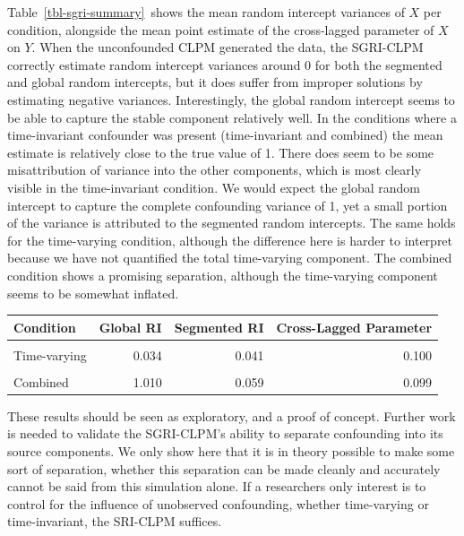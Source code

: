 \documentclass[
  man,
  floatsintext,
  longtable,
  nolmodern,
  notxfonts,
  notimes,
  colorlinks=true,linkcolor=blue,citecolor=blue,urlcolor=blue]{apa7}
\begin{document}
Table~\ref{tbl-sgri-summary}~shows the mean random intercept variances
of \(X\) per condition, alongside the mean point estimate of the
cross-lagged parameter of \(X\) on \(Y\). When the unconfounded CLPM
generated the data, the SGRI-CLPM correctly estimate random intercept
variances around 0 for both the segmented and global random intercepts,
but it does suffer from improper solutions by estimating negative
variances. Interestingly, the global random intercept seems to be able
to capture the stable component relatively well. In the conditions where
a time-invariant confounder was present (time-invariant and combined)
the mean estimate is relatively close to the true value of 1. There does
seem to be some misattribution of variance into the other components,
which is most clearly visible in the time-invariant condition. We would
expect the global random intercept to capture the complete confounding
variance of 1, yet a small portion of the variance is attributed to the
segmented random intercepts. The same holds for the time-varying
condition, although the difference here is harder to interpret because
we have not quantified the total time-varying component. The combined
condition shows a promising separation, although the time-varying
component seems to be somewhat inflated.

\begin{table}

{\caption{{Mean of Point Estimates for SGRI Model Parameters Across
Simulation Conditions}{\label{tbl-sgri-summary}}}
\vspace{-20pt}}

\begin{longtable*}[t]{lrrr}
\toprule
Condition & Global RI & Segmented RI & Cross-Lagged Parameter\\
\midrule
{} &  &  & \\
Time-varying & 0.034 & 0.041 & 0.100\\
 &  &  & \\
Combined & 1.010 & 0.059 & 0.099\\
\bottomrule
\end{longtable*}

\end{table}

These results should be seen as exploratory, and a proof of concept.
Further work is needed to validate the SGRI-CLPM's ability to separate
confounding into its source components. We only show here that it is in
theory possible to make some sort of separation, whether this separation
can be made cleanly and accurately cannot be said from this simulation
alone. If a researchers only interest is to control for the influence of
unobserved confounding, whether time-varying or time-invariant, the
SRI-CLPM suffices.
\end{document}

